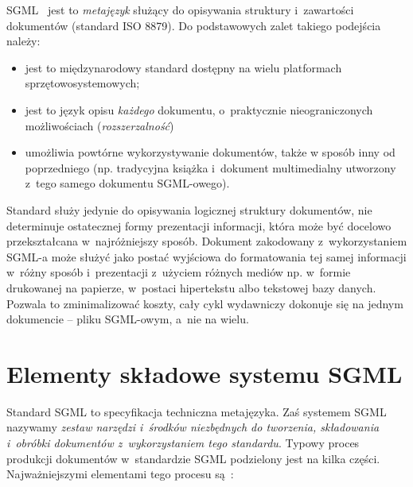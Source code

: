 \documentclass[brudnopis]{xmgr}
\begin{document}
SGML~\cite{Goldfarb:2002:CFG} jest to \emph{metajęzyk} służący do opisywania
struktury i~zawartości dokumentów (standard ISO 8879).  Do
podstawowych zalet takiego podejścia należy:
\begin{itemize}
\item
jest to międzynarodowy
standard dostępny na wielu platformach sprzętowo\-systemowych;
\item
jest to
język opisu \emph{każdego\/} dokumentu, o~praktycznie nieograniczonych
możliwościach (\emph{rozszerzalność\/})
\item
umożliwia powtórne
wykorzystywanie dokumentów, także w sposób inny od poprzedniego
(np. tradycyjna książka i~dokument multimedialny utworzony z~tego
samego dokumentu SGML-owego).
\end{itemize}

Standard służy jedynie do opisywania logicznej struktury dokumentów,
nie determinuje ostatecznej formy prezentacji informacji, która może
być docelowo przekształcana w~najróżniejszy sposób. Dokument
zakodowany z~wykorzystaniem SGML-a może służyć jako postać wyjściowa
do formatowania tej samej informacji w~różny sposób i~prezentacji
z~użyciem różnych mediów np. w~formie drukowanej na papierze,
w~postaci hipertekstu albo tekstowej bazy danych. Pozwala to
zminimalizować koszty, cały cykl wydawniczy dokonuje się
na jednym dokumencie -- pliku SGML-owym, a~nie na wielu.

\section{Elementy składowe systemu SGML}

Standard SGML to specyfikacja techniczna metajęzyka. Zaś systemem
SGML nazywamy \emph{zestaw narzędzi i~środków niezbędnych do
tworzenia, składowania i~obróbki dokumentów z~wykorzystaniem tego
standardu}.  Typowy proces produkcji dokumentów w~standardzie SGML
podzielony jest na kilka części. Najważniejszymi elementami tego
procesu są~\cite[s.~45--47]{Eisenberg:2002:SXM}:
\end{document}
